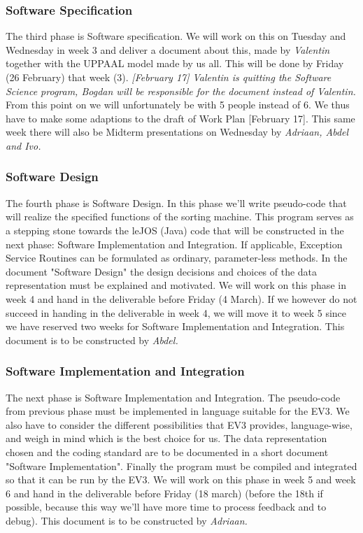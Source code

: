 \subsubsection{Software Specification}
\noindent The third phase is Software specification. We will work on this on Tuesday and Wednesday in week 3 and deliver a document about this, made by \emph{Valentin} together with the UPPAAL model made by us all. This will be done by Friday (26 February) that week (3). \emph{[February 17] Valentin is quitting the Software Science program, Bogdan will be responsible for the document instead of Valentin.} From this point on we will unfortunately be with 5 people instead of 6. We thus have to make some adaptions to the draft of  Work Plan [February 17]. This same week there will also be Midterm presentations on Wednesday by \emph{Adriaan, Abdel and Ivo.} \newpage

\subsubsection{Software Design}
\noindent The fourth phase is Software Design. In this phase we'll write pseudo-code that will realize the specified functions of the sorting machine. This program serves as a stepping stone towards the leJOS (Java) code that will be constructed in the next phase: Software Implementation and Integration. If applicable, Exception Service Routines can be formulated as ordinary, parameter-less methods. In the document "Software Design" the design decisions and choices of the data representation must be explained and motivated. We will work on this phase in week 4 and hand in the deliverable before Friday (4 March). If we however do not succeed in handing in the deliverable in week 4, we will move it to week 5 since we have reserved two weeks for Software Implementation and Integration. This document is to be constructed by \emph{Abdel.}

\subsubsection{Software Implementation and Integration}
The next phase is Software Implementation and Integration. The pseudo-code from previous phase must be implemented in language suitable for the EV3. We also have to consider the different possibilities that EV3 provides, language-wise, and weigh in mind which is the best choice for us. The data representation chosen and the coding standard are to be documented in a short document "Software Implementation". Finally the program must be compiled and integrated so that it can be run by the EV3. We will work on this phase in week 5 and week 6 and hand in the deliverable before Friday (18 march) (before the 18th if possible, because this way we'll have more time to process feedback and to debug). This document is to be constructed by \emph{Adriaan.}

